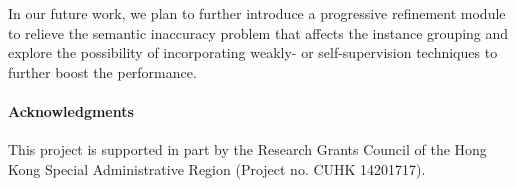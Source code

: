 \documentclass[10pt,twocolumn,letterpaper]{article}
\begin{document}
In our future work, we plan to further introduce a progressive refinement module to relieve the semantic inaccuracy problem that affects the instance grouping and explore the possibility of incorporating weakly- or self-supervision techniques to further boost the performance.


\vspace{-3.5mm}
\paragraph{Acknowledgments}
This project is supported in part by the Research Grants Council of the Hong Kong Special Administrative Region (Project no. CUHK 14201717).

{\small


}
\end{document}
